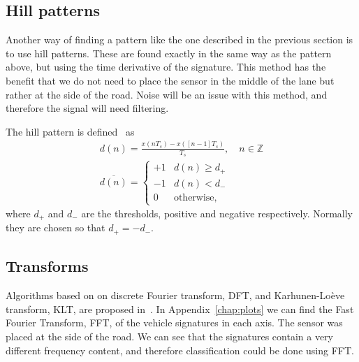 \subsection{Hill patterns}
Another way of finding a pattern like the one described in the previous section is to use hill patterns. These are found exactly in the same way as the pattern above, but using the time derivative of the signature. This method has the benefit that we do not need to place the sensor in the middle of the lane but rather at the side of the road. Noise will be an issue with this method, and therefore the signal will need filtering.

The hill pattern is defined~\cite{path2007} as
\begin{align}
 d(n) = \frac{x(nT_s)-x([n-1]T_s)}{T_s},\quad n \in \mathbb{Z}\\
 \overline{d(n)} = \left\{\begin{array}{cl}
+1 & d(n) \geq d_+\\
- 1 & d(n) < d_-\\
0 & \text{otherwise},  
\end{array}\right.
\end{align}
where $d_+$ and $d_-$ are the thresholds, positive and negative respectively. Normally they are chosen so that $d_+ = -d_-$.

\subsection{Transforms}
Algorithms based on on discrete Fourier transform, DFT, and Karhunen-Lo\`{e}ve transform, KLT, are proposed in~\cite{sun2000}. In \mbox{Appendix~\ref{chap:plots}} we can find the Fast Fourier Transform, FFT, of the vehicle signatures in each axis. The sensor was placed at the side of the road. We can see that the signatures contain a very different frequency content, and therefore classification could be done using FFT. 

% 
% 
% 


